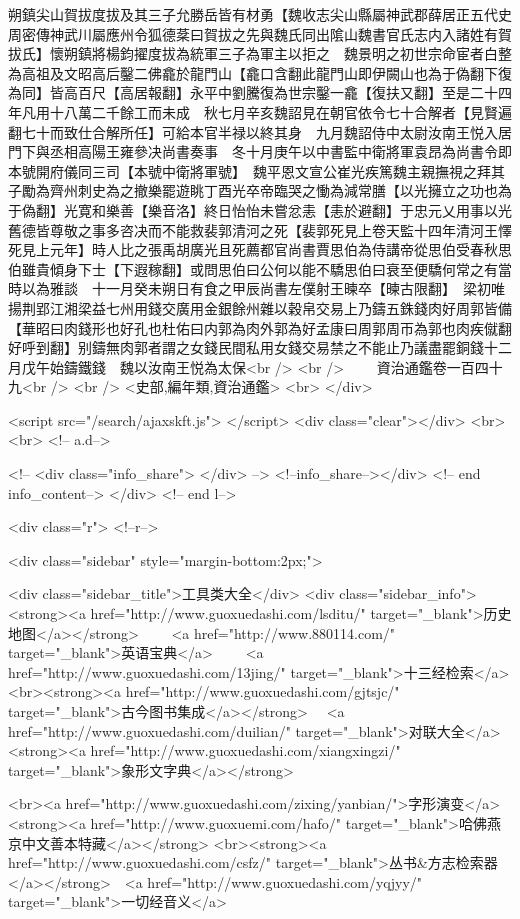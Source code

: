 朔鎮尖山賀拔度拔及其三子允勝岳皆有材勇【魏收志尖山縣屬神武郡薛居正五代史周密傳神武川屬應州令狐德棻曰賀拔之先與魏氏同出隂山魏書官氏志内入諸姓有賀拔氏】懷朔鎮將楊鈞擢度拔為統軍三子為軍主以拒之　魏景明之初世宗命宦者白整為高祖及文昭高后鑿二佛龕於龍門山【龕口含翻此龍門山即伊闕山也為于偽翻下復為同】皆高百尺【高居報翻】永平中劉騰復為世宗鑿一龕【復扶又翻】至是二十四年凡用十八萬二千餘工而未成　秋七月辛亥魏詔見在朝官依令七十合解者【見賢遍翻七十而致仕合解所任】可給本官半禄以終其身　九月魏詔侍中太尉汝南王悦入居門下與丞相高陽王雍參决尚書奏事　冬十月庚午以中書監中衛將軍袁昂為尚書令即本號開府儀同三司【本號中衛將軍號】　魏平恩文宣公崔光疾篤魏主親撫視之拜其子勵為齊州刺史為之撤樂罷遊眺丁酉光卒帝臨哭之慟為減常膳【以光擁立之功也為于偽翻】光寛和樂善【樂音洛】終日怡怡未嘗忿恚【恚於避翻】于忠元乂用事以光舊德皆尊敬之事多咨决而不能救裴郭清河之死【裴郭死見上卷天監十四年清河王懌死見上元年】時人比之張禹胡廣光且死薦都官尚書賈思伯為侍講帝從思伯受春秋思伯雖貴傾身下士【下遐稼翻】或問思伯曰公何以能不驕思伯曰衰至便驕何常之有當時以為雅談　十一月癸未朔日有食之甲辰尚書左僕射王暕卒【暕古限翻】　梁初唯揚荆郢江湘梁益七州用錢交廣用金銀餘州雜以穀帛交易上乃鑄五銖錢肉好周郭皆備【華昭曰肉錢形也好孔也杜佑曰内郭為肉外郭為好孟康曰周郭周帀為郭也肉疾僦翻好呼到翻】别鑄無肉郭者謂之女錢民間私用女錢交易禁之不能止乃議盡罷銅錢十二月戊午始鑄鐵錢　魏以汝南王悦為太保<br />
<br />
　　資治通鑑卷一百四十九<br />
<br />
<史部,編年類,資治通鑑>  <br>
   </div> 

<script src="/search/ajaxskft.js"> </script>
 <div class="clear"></div>
<br>
<br>
 <!-- a.d-->

 <!--
<div class="info_share">
</div> 
-->
 <!--info_share--></div>   <!-- end info_content-->
  </div> <!-- end l-->

<div class="r">   <!--r-->



<div class="sidebar"  style="margin-bottom:2px;">

 
<div class="sidebar_title">工具类大全</div>
<div class="sidebar_info">
<strong><a href="http://www.guoxuedashi.com/lsditu/" target="_blank">历史地图</a></strong>　　
<a href="http://www.880114.com/" target="_blank">英语宝典</a>　　
<a href="http://www.guoxuedashi.com/13jing/" target="_blank">十三经检索</a>　
<br><strong><a href="http://www.guoxuedashi.com/gjtsjc/" target="_blank">古今图书集成</a></strong>　
<a href="http://www.guoxuedashi.com/duilian/" target="_blank">对联大全</a>　<strong><a href="http://www.guoxuedashi.com/xiangxingzi/" target="_blank">象形文字典</a></strong>　

<br><a href="http://www.guoxuedashi.com/zixing/yanbian/">字形演变</a>　　<strong><a href="http://www.guoxuemi.com/hafo/" target="_blank">哈佛燕京中文善本特藏</a></strong>
<br><strong><a href="http://www.guoxuedashi.com/csfz/" target="_blank">丛书&方志检索器</a></strong>　<a href="http://www.guoxuedashi.com/yqjyy/" target="_blank">一切经音义</a>　　

